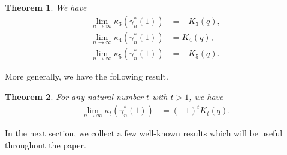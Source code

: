 \documentclass[11pt,reqno]{amsart}
\renewcommand{\(}{\left\(}
\renewcommand{\)}{\right\)}
\renewcommand{\[}{\left\[}
\renewcommand{\]}{\right\]}
\numberwithin{equation}{section}
\theoremstyle{plain}
\newtheorem{theorem}{Theorem}[section]
\begin{document}
\begin{theorem}\label{theorem for kappa_3, kappa_4 and kappa_5}
We have
\begin{align}
\lim_{n\rightarrow \infty}\kappa_3(\gamma_n^*(1))&= -K_3(q), \label{kappa_3} \\
\lim_{n\rightarrow \infty}\kappa_4(\gamma_n^*(1))&= K_4(q), \label{kappa_4} \\
\lim_{n\rightarrow \infty}\kappa_5(\gamma_n^*(1))&= -K_5(q). \label{kappa_5}
\end{align}
\end{theorem}
More generally,  we have the following result. 
\begin{theorem}\label{Conjecture}
For any natural number $t$ with $t>1$, we have
\begin{align*}
\lim_{n\rightarrow \infty}\kappa_t(\gamma_n^*(1))&= (-1)^t K_t(q).
\end{align*}
\end{theorem}
In the next section,  we collect a few well-known results which will be useful throughout the paper.  
\end{document}
